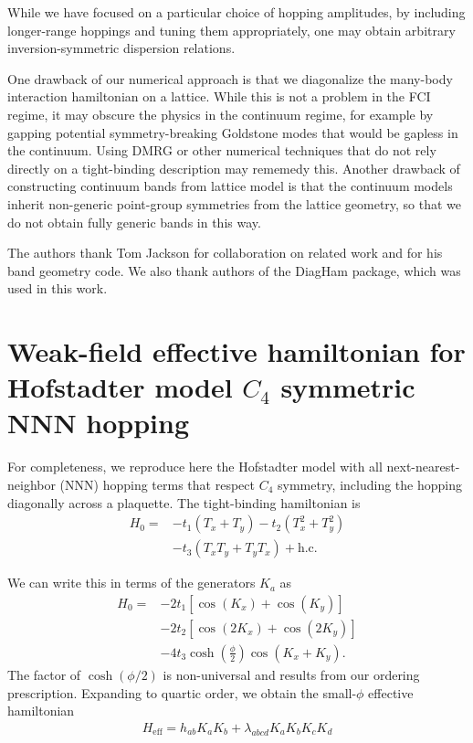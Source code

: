 \documentclass[aps,prb,twocolumn,letterpaper,twoside,nobalancelastpage,groupedaddress,amsmath,amssymb,floatfix,citeautoscript]{revtex4-1}
\begin{document}
While we have focused on a particular choice of hopping amplitudes, by including longer-range hoppings and tuning them appropriately, one may obtain arbitrary inversion-symmetric dispersion relations. 

One drawback of our numerical approach is that we diagonalize the many-body interaction hamiltonian on a lattice. While this is not a problem in the FCI regime, it may obscure the physics in the continuum regime, for example by gapping potential symmetry-breaking Goldstone modes that would be gapless in the continuum. Using DMRG or other numerical techniques that do not rely directly on a tight-binding description may rememedy this. Another drawback of constructing continuum bands from lattice model is that the continuum models inherit non-generic point-group symmetries from the lattice geometry, so that we do not obtain fully generic bands in this way.

\begin{acknowledgments}
The authors thank Tom Jackson for collaboration on related work and for his band geometry code. We also thank authors of the DiagHam package, which was used in this work.

\end{acknowledgments}


%

\clearpage
\appendix
\section{Weak-field effective hamiltonian for Hofstadter model $C_4$ symmetric NNN hopping}
For completeness, we reproduce here the  Hofstadter model with all next-nearest-neighbor (NNN) hopping terms that respect $C_4$ symmetry, including the hopping diagonally across a plaquette. The tight-binding hamiltonian is
\begin{align*}
H_0 = &-t_1 \left(T_x + T_y\right)\nonumber - t_2 \left(T_x^{2} + T_y^{2}\right)\\ &- t_3 \left(T_xT_y + T_y T_x\right) + \text{h.c.}
\end{align*}

We can write this in terms of the generators $K_a$ as
\begin{align*}
H_0 = &-2t_1 \left[\cos\left(K_x\right) + \cos\left(K_y\right)\right]\\ &-2t_2 \left[\cos\left(2K_x\right)+\cos\left(2K_y\right)\right]\\ &- 4t_3 \cosh\left(\frac{\phi}{2}\right)\cos\left(K_x + K_y\right).
\end{align*}
The factor of $\cosh(\phi/2)$ is non-universal and results from our ordering prescription. Expanding to quartic order, we obtain the small-$\phi$ effective hamiltonian
\begin{align*}
H_{\text{eff}} = h_{ab}K_a K_b + \lambda_{abcd} K_a K_b K_c K_d 
\end{align*}
\end{document}
